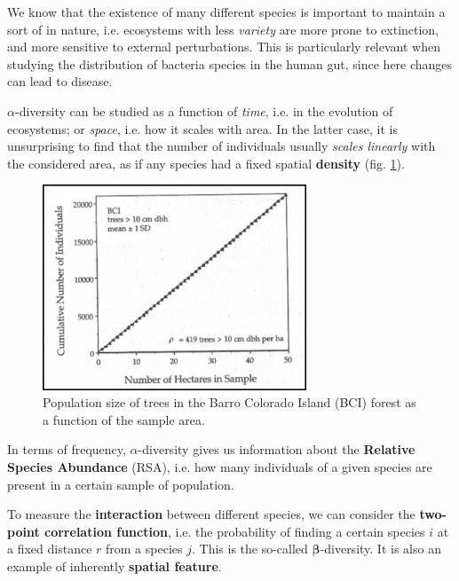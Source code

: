 \documentclass[../../main.tex]{subfiles}
\begin{document}
We know that the existence of many different species is important to maintain a sort of  in nature, i.e. ecosystems with less \textit{variety} are more prone to extinction, and more sensitive to external perturbations. This is particularly relevant when studying the distribution of bacteria species in the human gut, since here changes can lead to disease.  

\medskip

$\alpha$-diversity can be studied as a function of \textit{time}, i.e. in the evolution of ecosystems; or \textit{space}, i.e. how it scales with area. In the latter case, it is unsurprising to find that the number of individuals usually \textit{scales linearly} with the considered area, as if any species had a fixed spatial \textbf{density} (fig. \ref{fig:constant-density}).

\begin{figure}[H]
    \centering
    \includegraphics[width=0.7\textwidth]{constant-density.png}
    \caption{Population size of trees in the Barro Colorado Island (BCI) forest as a function of the sample area.}
    \label{fig:constant-density}
\end{figure}

In terms of frequency, $\alpha$-diversity gives us information about the \textbf{Relative Species Abundance} (RSA), i.e. how many individuals of a given species are present in a certain sample of population.

\medskip

To measure the \textbf{interaction} between different species, we can consider the \textbf{two-point correlation function}, i.e. the probability of finding a certain species $i$ at a fixed distance $r$ from a species $j$. This is the so-called $\bm{\beta}$-diversity. It is also an example of inherently \textbf{spatial feature}. 
\medskip
\end{document}

